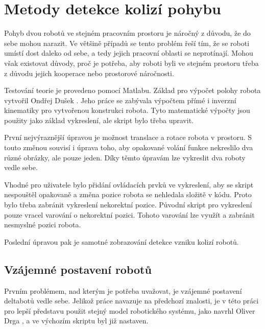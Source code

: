 

\chapter{Metody detekce kolizí pohybu}
    Pohyb dvou robotů ve stejném pracovním prostoru je náročný z důvodu,
    že do sebe mohou narazit. Ve většině případů se tento problém řeší tím,
    že se roboti umístí dost daleko od sebe, a tedy jejich pracovní oblasti
    se neprotínají. Mohou však existovat důvody, proč je potřeba, aby roboti
    byli ve stejném prostoru třeba z důvodu jejich kooperace nebo prostorové
    náročnosti.

    Testování teorie je provedeno pomocí Matlabu. Základ pro výpočet polohy robota vytvořil
    Ondřej Dušek \cite{dusek}. Jeho práce se zabývala výpočtem přímé i inverzní kinematiky 
    pro vytvořenou konstrukci robota. Tyto matematické výpočty jsou použity jako základ
    vykreslení, ale skript bylo třeba upravit.

    První nejvýraznější úpravou je možnost translace a rotace robota v prostoru. S touto
    změnou souvisí i úprava toho, aby opakované volání funkce nekreslilo dva různé obrázky,
    ale pouze jeden. Díky těmto úpravám lze vykreslit dva roboty vedle sebe.

    Vhodné pro uživatele bylo přidání ovládacích prvků ve vykreslení, aby se skript 
    nespouštěl opakovaně a změna pozice robota se nehledala složitě v kódu. Proto
    bylo třeba zabránit vykreslení nekorektní pozice. Původní skript pro vykreslení pouze
    vracel varování o nekorektní pozici. Tohoto varování lze využít a zabránit nesmyslné
    pozici robota.

    Poslední úpravou pak je samotné zobrazování detekce vzniku kolizí robotů.

    
    \section{Vzájemné postavení robotů}
        Prvním problémem, nad kterým je potřeba uvažovat, je vzájemné postavení deltabotů 
        vedle sebe. Jelikož práce navazuje na předchozí znalosti, je v této 
        práci pro lepší představu použit stejný model robotického systému, jako
        navrhl Oliver Drga \cite{drga}, a ve výchozím skriptu byl již nastaven.
        
